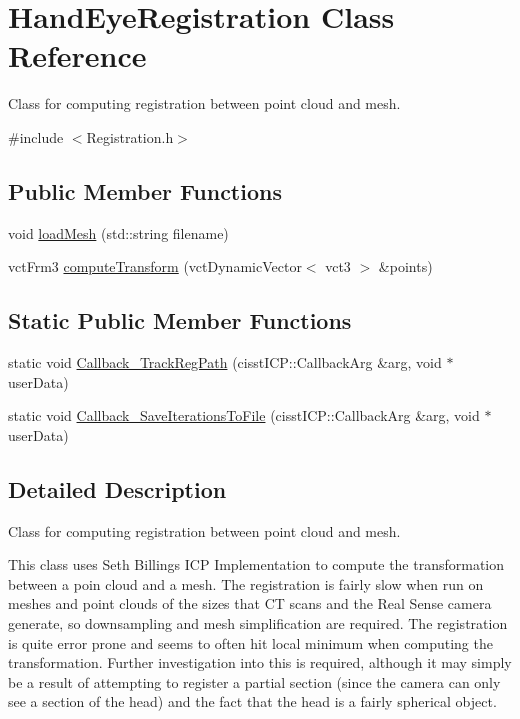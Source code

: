 \hypertarget{class_hand_eye_registration}{}\section{Hand\+Eye\+Registration Class Reference}
\label{class_hand_eye_registration}


Class for computing registration between point cloud and mesh.  




{\ttfamily \#include $<$Registration.\+h$>$}

\subsection*{Public Member Functions}
\begin{DoxyCompactItemize}
\item 
void \hyperlink{class_hand_eye_registration_a9734ab868be5a34a95a5790f44808d1b}{load\+Mesh} (std\+::string filename)
\item 
vct\+Frm3 \hyperlink{class_hand_eye_registration_a311fe0a35cdc698e68e26d7b742bb21f}{compute\+Transform} (vct\+Dynamic\+Vector$<$ vct3 $>$ \&points)
\end{DoxyCompactItemize}
\subsection*{Static Public Member Functions}
\begin{DoxyCompactItemize}
\item 
static void \hyperlink{class_hand_eye_registration_aacb8a8fe65f148fc7b3ed77e9a6948a1}{Callback\+\_\+\+Track\+Reg\+Path} (cisst\+I\+C\+P\+::\+Callback\+Arg \&arg, void $\ast$user\+Data)
\item 
static void \hyperlink{class_hand_eye_registration_af3244e35eec3e903492458c40c8cfd0e}{Callback\+\_\+\+Save\+Iterations\+To\+File} (cisst\+I\+C\+P\+::\+Callback\+Arg \&arg, void $\ast$user\+Data)
\end{DoxyCompactItemize}


\subsection{Detailed Description}
Class for computing registration between point cloud and mesh. 

This class uses Seth Billing\textquotesingle{}s I\+CP Implementation to compute the transformation between a poin cloud and a mesh. The registration is fairly slow when run on meshes and point clouds of the sizes that CT scans and the Real Sense camera generate, so downsampling and mesh simplification are required. The registration is quite error prone and seems to often hit local minimum when computing the transformation. Further investigation into this is required, although it may simply be a result of attempting to register a partial section (since the camera can only see a section of the head) and the fact that the head is a fairly spherical object. 

